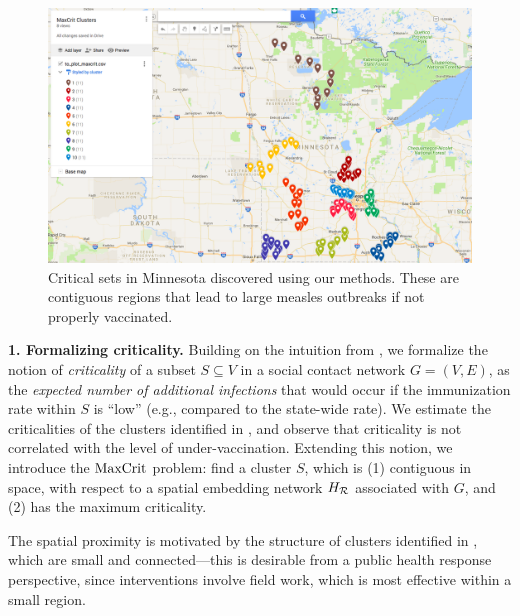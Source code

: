 \begin{figure}
\centering
\includegraphics[width=.4\textwidth]{img/maxcrit_clusters.png}
\caption{Critical sets in Minnesota discovered using our methods. These are contiguous regions that lead to large measles outbreaks if not properly vaccinated.
\vspace{-0.15in}
}
\label{fig:mn-criticalsets}
\end{figure}
%
\noindent
\textbf{1. Formalizing criticality.}
Building on the intuition from \cite{metcalf:epidemics15}, we formalize the notion of \emph{criticality} of a subset
$S\subseteq V$ in a social contact network $G=(V, E)$, as the \emph{expected number of additional infections} that would occur 
if the immunization rate within $S$ is ``low''  (e.g., compared to the state-wide rate). We estimate the criticalities of the clusters identified in \cite{cadena:vacc-cluster},
and observe that criticality is not correlated with the level of under-vaccination.
Extending this notion, we introduce the $\text{MaxCrit}{}$ problem: find a cluster $S$, which is
(1) contiguous in space, with respect to a spatial embedding network $H_{\mathcal{R}}$ associated with $G$, 
and (2) has the maximum criticality.

The spatial proximity is motivated by the structure of clusters identified in 
\cite{lieu2015geographic,atwell:pediatrics13,cadena:vacc-cluster}, which are small and connected---this is desirable
from a public health response perspective, since interventions involve field work, which is most effective within a small region.



